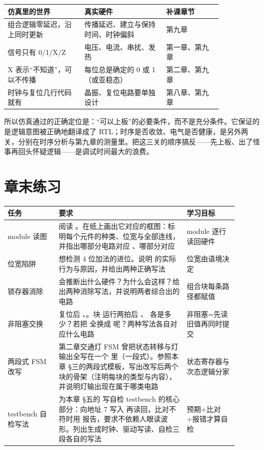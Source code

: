 \begin{longtable}{L{0.3\linewidth}L{0.32\linewidth}L{0.22\linewidth}}
\toprule
仿真里的世界 & 真实硬件 & 补课章节 \\
\midrule
组合逻辑零延迟，沿上同时更新 & 传播延迟、建立与保持时间、时钟偏斜 & 第九章 \\
信号只有 0/1/X/Z & 电压、电流、串扰、发热 & 第一章、第九章 \\
X 表示“不知道”，可以不传播 & 每位总是确定的 0 或 1（或亚稳态） & 第二章、第九章 \\
时钟与复位几行代码就有 & 晶振、复位电路要单独设计 & 第八章、第九章 \\
\bottomrule
\end{longtable}

所以仿真通过的正确定位是：“可以上板”的必要条件，而不是充分条件。它保证的是逻辑意图被正确地翻译成了 RTL；时序是否收敛、电气是否健康，是另外两关，分别在时序分析与第九章的测量里。把这三关的顺序搞反——先上板、出了怪事再回头怀疑逻辑——是调试时间最大的浪费。

\section*{章末练习}

\begin{longtable}{L{0.2\linewidth}L{0.5\linewidth}L{0.2\linewidth}}
\toprule
任务 & 要求 & 学习目标 \\
\midrule
module 读图 & 阅读 。在纸上画出它对应的框图：标明每个元件的种类、位宽与全部连线，并指出哪部分电路对应 、哪部分对应  & module 逐行读回硬件 \\
位宽陷阱 &  想检测 4 位加法的进位。说明  的实际行为与原因，并给出两种正确写法 & 位宽由语境决定 \\
锁存器消除 &  会推断出什么硬件？为什么会这样？给出两种消除写法，并说明两者综合出的电路 & 组合块每条路径都赋值 \\
非阻塞交换 & 复位后 、。块  运行两拍后 、 各是多少？若把 \code{<=} 全换成 \code{=} 呢？两种写法各自对应什么电路 & 非阻塞=先读旧值再同时提交 \\
两段式 FSM 改写 & 第二章交通灯 FSM 曾把状态转移与灯输出全写在一个  里（一段式）。参照本章 §三的两段式模板，写出改写后两个块的骨架（注明每块的类型与内容），并说明灯输出现在属于哪类电路 & 状态寄存器与次态逻辑分家 \\
testbench 自检写法 & 为本章 §五的  写自检 testbench 的核心部分：向地址 7 写入  再读回，比对不符时用  报告，要求不依赖人眼读波形。列出生成时钟、驱动写读、自检三段各自的写法 & 预期+比对+报错才算自检 \\
\bottomrule
\end{longtable}

